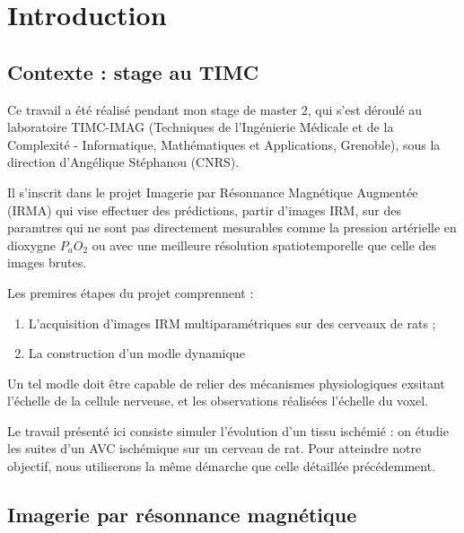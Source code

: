 \section{Introduction}

\subsection{Contexte : stage au TIMC}

Ce travail a \'et\'e r\'ealis\'e pendant mon stage de master 2, qui s'est d\'eroul\'e au laboratoire TIMC-IMAG %
(Techniques de l'Ingénierie M\'edicale et de la Complexit\'e - Informatique, Mathématiques et Applications, Grenoble), %
sous la direction d'Angélique Stéphanou (CNRS). 

\par
Il s'inscrit dans le projet Imagerie par Résonnance Magn\'etique Augment\'ee (IRMA) qui vise  effectuer des pr\'edictions, %
 partir d'images IRM, sur des paramtres qui ne sont pas directement mesurables comme la pression art\'erielle en dioxygne $P_aO_2$ %
ou avec une meilleure r\'esolution spatiotemporelle que celle des images brutes.

\par
Les premires \'etapes du projet comprennent :
\begin{enumerate}
\item L'acquisition d'images IRM multiparam\'etriques sur des cerveaux de rats ;
\item La construction d'un modle dynamique 
\end{enumerate}

Un tel modle doit \^etre capable de relier des m\'ecanismes physiologiques exsitant  l'\'echelle de la cellule nerveuse, %
et les observations r\'ealis\'ees  l'\'echelle du voxel.

\par
Le travail pr\'esent\'e ici consiste  simuler l'\'evolution d'un tissu isch\'emi\'e : %
on \'etudie les suites d'un AVC isch\'emique sur un cerveau de rat. %
Pour atteindre notre objectif, nous utiliserons la m\^eme d\'emarche que celle d\'etaill\'ee pr\'ec\'edemment.

\subsection{Imagerie par r\'esonnance magn\'etique}%

